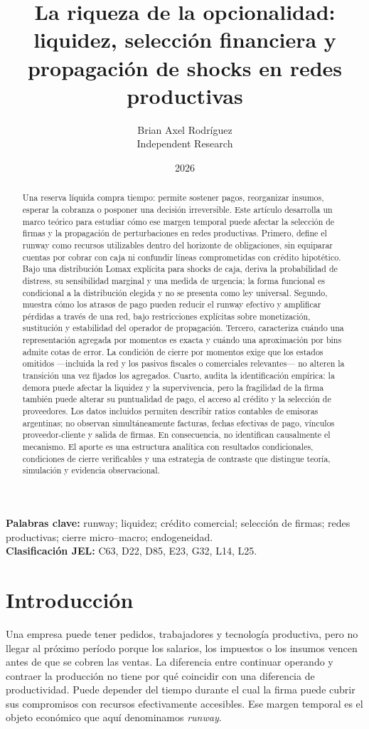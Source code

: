 \documentclass[11pt,a4paper]{article}
\title{\textbf{La riqueza de la opcionalidad: liquidez, selección financiera y propagación de shocks en redes productivas}}
\author{Brian Axel Rodríguez\\\small Independent Research}
\date{2026}
\begin{document}
\maketitle
\begin{abstract}
Una reserva líquida compra tiempo: permite sostener pagos, reorganizar insumos, esperar la cobranza o posponer una decisión irreversible. Este artículo desarrolla un marco teórico para estudiar cómo ese margen temporal puede afectar la selección de firmas y la propagación de perturbaciones en redes productivas. Primero, define el runway como recursos utilizables dentro del horizonte de obligaciones, sin equiparar cuentas por cobrar con caja ni confundir líneas comprometidas con crédito hipotético. Bajo una distribución Lomax explícita para shocks de caja, deriva la probabilidad de distress, su sensibilidad marginal y una medida de urgencia; la forma funcional es condicional a la distribución elegida y no se presenta como ley universal. Segundo, muestra cómo los atrasos de pago pueden reducir el runway efectivo y amplificar pérdidas a través de una red, bajo restricciones explícitas sobre monetización, sustitución y estabilidad del operador de propagación. Tercero, caracteriza cuándo una representación agregada por momentos es exacta y cuándo una aproximación por bins admite cotas de error. La condición de cierre por momentos exige que los estados omitidos —incluida la red y los pasivos fiscales o comerciales relevantes— no alteren la transición una vez fijados los agregados. Cuarto, audita la identificación empírica: la demora puede afectar la liquidez y la supervivencia, pero la fragilidad de la firma también puede alterar su puntualidad de pago, el acceso al crédito y la selección de proveedores. Los datos incluidos permiten describir ratios contables de emisoras argentinas; no observan simultáneamente facturas, fechas efectivas de pago, vínculos proveedor-cliente y salida de firmas. En consecuencia, no identifican causalmente el mecanismo. El aporte es una estructura analítica con resultados condicionales, condiciones de cierre verificables y una estrategia de contraste que distingue teoría, simulación y evidencia observacional.
\end{abstract}
\noindent\textbf{Palabras clave:} runway; liquidez; crédito comercial; selección de firmas; redes productivas; cierre micro--macro; endogeneidad.\\
\noindent\textbf{Clasificación JEL:} C63, D22, D85, E23, G32, L14, L25.

\section{Introducción}
Una empresa puede tener pedidos, trabajadores y tecnología productiva, pero no llegar al próximo período porque los salarios, los impuestos o los insumos vencen antes de que se cobren las ventas. La diferencia entre continuar operando y contraer la producción no tiene por qué coincidir con una diferencia de productividad. Puede depender del tiempo durante el cual la firma puede cubrir sus compromisos con recursos efectivamente accesibles. Ese margen temporal es el objeto económico que aquí denominamos \emph{runway}.
\end{document}

